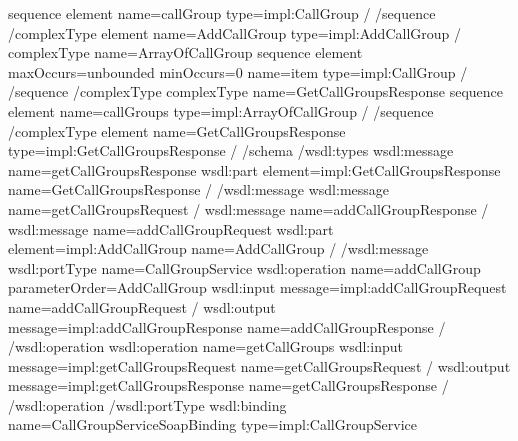 \documentclass[letterpaper,10pt,english]{sphinxmanual}
\begin{document}
\begin{sphinxVerbatim}[commandchars=\\\{\}]
\PYGZlt{}sequence\PYGZgt{}
\PYGZlt{}element name=\PYGZdq{}callGroup\PYGZdq{} type=\PYGZdq{}impl:CallGroup\PYGZdq{} /\PYGZgt{}
\PYGZlt{}/sequence\PYGZgt{}
\PYGZlt{}/complexType\PYGZgt{}
\PYGZlt{}element name=\PYGZdq{}AddCallGroup\PYGZdq{} type=\PYGZdq{}impl:AddCallGroup\PYGZdq{} /\PYGZgt{}
\PYGZlt{}complexType name=\PYGZdq{}ArrayOfCallGroup\PYGZdq{}\PYGZgt{}
\PYGZlt{}sequence\PYGZgt{}
\PYGZlt{}element maxOccurs=\PYGZdq{}unbounded\PYGZdq{} minOccurs=\PYGZdq{}0\PYGZdq{} name=\PYGZdq{}item\PYGZdq{} type=\PYGZdq{}impl:CallGroup\PYGZdq{} /\PYGZgt{}
\PYGZlt{}/sequence\PYGZgt{}
\PYGZlt{}/complexType\PYGZgt{}
\PYGZlt{}complexType name=\PYGZdq{}GetCallGroupsResponse\PYGZdq{}\PYGZgt{}
\PYGZlt{}sequence\PYGZgt{}
\PYGZlt{}element name=\PYGZdq{}callGroups\PYGZdq{} type=\PYGZdq{}impl:ArrayOfCallGroup\PYGZdq{} /\PYGZgt{}
\PYGZlt{}/sequence\PYGZgt{}
\PYGZlt{}/complexType\PYGZgt{}
\PYGZlt{}element name=\PYGZdq{}GetCallGroupsResponse\PYGZdq{} type=\PYGZdq{}impl:GetCallGroupsResponse\PYGZdq{} /\PYGZgt{}
\PYGZlt{}/schema\PYGZgt{}
\PYGZlt{}/wsdl:types\PYGZgt{}
\PYGZlt{}wsdl:message name=\PYGZdq{}getCallGroupsResponse\PYGZdq{}\PYGZgt{}
\PYGZlt{}wsdl:part element=\PYGZdq{}impl:GetCallGroupsResponse\PYGZdq{} name=\PYGZdq{}GetCallGroupsResponse\PYGZdq{} /\PYGZgt{}
\PYGZlt{}/wsdl:message\PYGZgt{}
\PYGZlt{}wsdl:message name=\PYGZdq{}getCallGroupsRequest\PYGZdq{} /\PYGZgt{}
\PYGZlt{}wsdl:message name=\PYGZdq{}addCallGroupResponse\PYGZdq{} /\PYGZgt{}
\PYGZlt{}wsdl:message name=\PYGZdq{}addCallGroupRequest\PYGZdq{}\PYGZgt{}
\PYGZlt{}wsdl:part element=\PYGZdq{}impl:AddCallGroup\PYGZdq{} name=\PYGZdq{}AddCallGroup\PYGZdq{} /\PYGZgt{}
\PYGZlt{}/wsdl:message\PYGZgt{}
\PYGZlt{}wsdl:portType name=\PYGZdq{}CallGroupService\PYGZdq{}\PYGZgt{}
\PYGZlt{}wsdl:operation name=\PYGZdq{}addCallGroup\PYGZdq{} parameterOrder=\PYGZdq{}AddCallGroup\PYGZdq{}\PYGZgt{}
\PYGZlt{}wsdl:input message=\PYGZdq{}impl:addCallGroupRequest\PYGZdq{} name=\PYGZdq{}addCallGroupRequest\PYGZdq{} /\PYGZgt{}
\PYGZlt{}wsdl:output message=\PYGZdq{}impl:addCallGroupResponse\PYGZdq{} name=\PYGZdq{}addCallGroupResponse\PYGZdq{} /\PYGZgt{}
\PYGZlt{}/wsdl:operation\PYGZgt{}
\PYGZlt{}wsdl:operation name=\PYGZdq{}getCallGroups\PYGZdq{}\PYGZgt{}
\PYGZlt{}wsdl:input message=\PYGZdq{}impl:getCallGroupsRequest\PYGZdq{} name=\PYGZdq{}getCallGroupsRequest\PYGZdq{} /\PYGZgt{}
\PYGZlt{}wsdl:output message=\PYGZdq{}impl:getCallGroupsResponse\PYGZdq{} name=\PYGZdq{}getCallGroupsResponse\PYGZdq{} /\PYGZgt{}
\PYGZlt{}/wsdl:operation\PYGZgt{}
\PYGZlt{}/wsdl:portType\PYGZgt{}
\PYGZlt{}wsdl:binding name=\PYGZdq{}CallGroupServiceSoapBinding\PYGZdq{} type=\PYGZdq{}impl:CallGroupService\PYGZdq{}\PYGZgt{}

\end{sphinxVerbatim}
\end{document}
